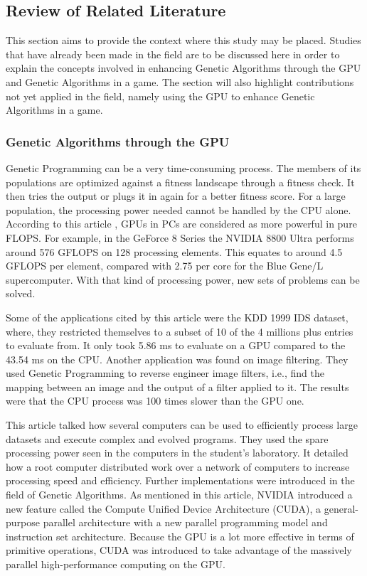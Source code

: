 \subsection*{Review of Related Literature}
	This section aims to provide the context where this study may be placed. 
	Studies that have already been made in the field are to be discussed here in order to 
	explain the concepts involved in enhancing Genetic Algorithms through the GPU and 
	Genetic Algorithms in a game. The section will also highlight contributions not yet 
	applied in the field, namely using the GPU to enhance Genetic Algorithms in a game.

	
\subsubsection*{Genetic Algorithms through the GPU}

	Genetic Programming can be a very time-consuming process.  The members of its populations are optimized against a fitness landscape through a fitness check.  
	It then tries the output or plugs it in again for a better fitness score. For a large population, the processing power needed cannot be handled by the CPU alone.  
	According to this article , GPUs in PCs are considered as more powerful in pure FLOPS\cite{Banzhaf09}.  For example, in the GeForce 8 Series the NVIDIA 8800 Ultra performs around 576 GFLOPS 
	on 128 processing elements.  This equates to around 4.5 GFLOPS per element, compared with 2.75 per core for the Blue Gene/L supercomputer.  With that kind of processing power, 
	new sets of problems can be solved.  

	Some of the applications cited by this article were the KDD 1999 IDS dataset, where, they restricted themselves to a subset of 10%
	of the 4 millions plus entries to evaluate from\cite{Banzhaf09}.  It only took 5.86 ms to evaluate on a GPU compared to the 43.54 ms on the CPU.  Another application was found on image filtering.  
	They used Genetic Programming to reverse engineer image filters, i.e., find the mapping between an image and the output of a filter applied to it.  The results were that the CPU process 
	was 100 times slower than the GPU one.  

	This article talked how several computers can be used to efficiently process large datasets and execute complex and evolved programs\cite{Harding09}.  
	They used the spare processing power seen in the computers in the student's laboratory.  It detailed how a root computer distributed work over a network of computers to increase processing speed and efficiency.
	Further implementations were introduced in the field of Genetic Algorithms.  As mentioned in this article, NVIDIA introduced a new feature called the Compute Unified Device Architecture (CUDA), 
	a general-purpose parallel architecture with a new parallel programming model and instruction set architecture\cite{Zhang09}.  Because the GPU is a lot more effective in terms of primitive operations, 
	CUDA was introduced to take advantage of the massively parallel high-performance computing on the GPU.  

